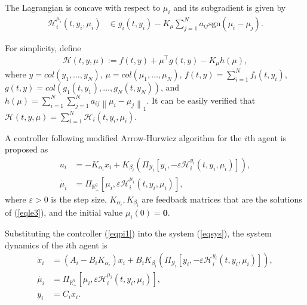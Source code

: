 \documentclass[letterpaper, 10 pt, conference]{ieeeconf}  %
\newcommand{\sign}[1]{\mathrm{sgn}(#1)}
\begin{document}
The Lagrangian is concave with respect to $\mu_i$ and its subgradient is given by
\begin{align}
	\mathcal{H}_i^{\mu_i}(t,y_i,\mu_i)&\in g_i(t,y_i) - K_\mu\sum_{j=1}^N a_{ij}\sign{\mu_i-\mu_j}.\label{lamu}
\end{align}

For simplicity, define
\begin{align}
	\mathcal{H}(t,y,\mu):= f(t,y)+\mu^\top g(t,y) - K_\mu h(\mu),\label{lag}
\end{align}
where $y=col(y_1,\dots, y_N)$, $\mu=col(\mu_1, \dots, \mu_N)$, $f(t,y)=\sum_{i=1}^{N}f_{i}(t, y_i)$, $g(t,y)=col(g_1(t,y_1), \dots, g_N(t,y_N))$, and $h(\mu)= \sum_{i=1}^N\sum_{j=1}^Na_{ij}\left\|\mu_i-\mu_j\right\|_1$. It can be easily verified that  $\mathcal{H}(t,y,\mu)=\sum_{i=1}^{N}\mathcal{H}_i(t,y_i,\mu_i)$.


A controller following modified Arrow-Hurwicz algorithm for the $i$th agent is proposed as
\begin{subequations}\label{eqpi1}
	\begin{align}
		u_i&=-K_{\alpha_i} x_i+K_{\beta_i} \left(\Pi_{\mathcal{Y}_i}[y_i, -\varepsilon\mathcal{H}_i^{y_i}(t,y_i,\mu_i)]\right),\label{eqpi1a}\\
		\dot{\mu_i}&=\Pi_{\mathbb{R}_+^q}[\mu_i,\varepsilon\mathcal{H}_i^{\mu_i}(t,y_i,\mu_i)], \label{eqpi1b}
	\end{align}
\end{subequations}
where $\varepsilon>0$ is the step size, $K_{\alpha_i},K_{\beta_i}$ are feedback matrices that are the solutions of (\ref{eqle3}), and the initial value $\mu_i(0){=}\boldsymbol{0}$.


Substituting the controller (\ref{eqpi1}) into the system (\ref{eqsys}), the system dynamics of the $i$th agent is
\begin{subequations}\label{eqpi2}
	\begin{align}
		\dot x_i&{=}(A_i{-}B_i K_{\alpha_i})x_i{+}B_iK_{\beta_i}\left(\Pi_{\mathcal{Y}_i}[y_i, -\varepsilon\mathcal{H}_i^{y_i}(t,y_i,\mu_i)]\right),\label{eqpi2a}\\
		\dot{\mu_i}&{=}\Pi_{\mathbb{R}_+^q}[\mu_i,\varepsilon\mathcal{H}_i^{\mu_i}(t,y_i,\mu_i)] ,\label{eqpi2b}\\
		y_i&{=}C_ix_i.\label{eqpi2c}
	\end{align}
\end{subequations}
\end{document}
